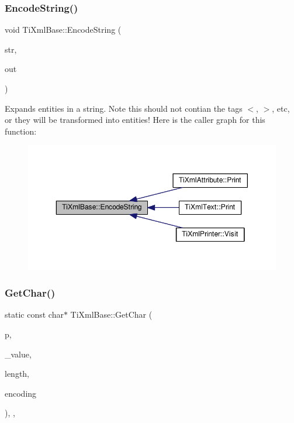\subsubsection{\texorpdfstring{Encode\+String()}{EncodeString()}}
{\footnotesize\ttfamily void Ti\+Xml\+Base\+::\+Encode\+String (\begin{DoxyParamCaption}\item[{const \hyperlink{tinyxml_8h_a92bada05fd84d9a0c9a5bbe53de26887}{T\+I\+X\+M\+L\+\_\+\+S\+T\+R\+I\+NG} \&}]{str,  }\item[{\hyperlink{tinyxml_8h_a92bada05fd84d9a0c9a5bbe53de26887}{T\+I\+X\+M\+L\+\_\+\+S\+T\+R\+I\+NG} $\ast$}]{out }\end{DoxyParamCaption})\hspace{0.3cm}{\ttfamily [static]}}

Expands entities in a string. Note this should not contian the tag\textquotesingle{}s \textquotesingle{}$<$\textquotesingle{}, \textquotesingle{}$>$\textquotesingle{}, etc, or they will be transformed into entities! Here is the caller graph for this function\+:
\nopagebreak
\begin{figure}[H]
\begin{center}
\leavevmode
\includegraphics[width=350pt]{class_ti_xml_base_a32ed202562b58de64c7d799ca3c9db98_icgraph}
\end{center}
\end{figure}
\mbox{\label{class_ti_xml_base_a5b0fde72d6f662ae1fd6303195d2159b}} 
\subsubsection{\texorpdfstring{Get\+Char()}{GetChar()}}
{\footnotesize\ttfamily static const char$\ast$ Ti\+Xml\+Base\+::\+Get\+Char (\begin{DoxyParamCaption}\item[{const char $\ast$}]{p,  }\item[{char $\ast$}]{\+\_\+value,  }\item[{int $\ast$}]{length,  }\item[{\hyperlink{tinyxml_8h_a88d51847a13ee0f4b4d320d03d2c4d96}{Ti\+Xml\+Encoding}}]{encoding }\end{DoxyParamCaption})\hspace{0.3cm}{\ttfamily [inline]}, {\ttfamily [static]}, {\ttfamily [protected]}}

